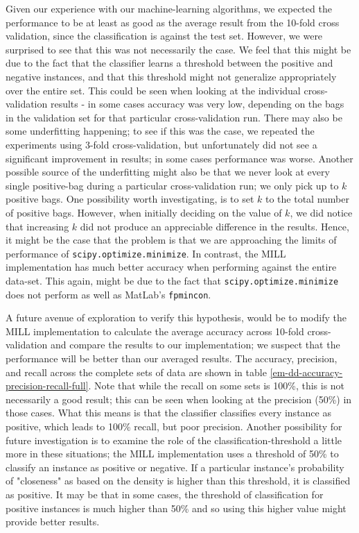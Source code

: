 \documentclass[conference]{IEEEtran}
\begin{document}
Given our experience with our machine-learning algorithms, we expected the performance to be at least as good as the average result from the 10-fold cross validation, since the classification is against the test set. However, we were surprised to see that this was not necessarily the case. We feel that this might be due to the fact that the classifier learns a threshold between the positive and negative instances, and that this threshold might not generalize appropriately over the entire set. This could be seen when looking at the individual cross-validation results - in some cases accuracy was very low, depending on the bags in the validation set for that particular cross-validation run. There may also be some underfitting happening; to see if this was the case, we repeated the experiments using 3-fold cross-validation, but unfortunately did not see a significant improvement in results; in some cases performance was worse. Another possible source of the underfitting might also be that we never look at every single positive-bag during a particular cross-validation run; we only pick up to $k$ positive bags. One possibility worth investigating, is to set $k$ to the total number of positive bags. However, when initially deciding on the value of $k$, we did notice that increasing $k$ did not produce an appreciable difference in the results. Hence, it might be the case that the problem is that we are approaching the limits of performance of \texttt{scipy.optimize.minimize}. In contrast, the MILL implementation has much better accuracy when performing against the entire data-set. This again, might be due to the fact that \texttt{scipy.optimize.minimize} does not perform as well as MatLab's \texttt{fpmincon}. 

A future avenue of exploration to verify this hypothesis, would be to modify the MILL implementation to calculate the average accuracy across 10-fold cross-validation and compare the results to our implementation; we suspect that the performance will be better than our averaged results. The accuracy, precision, and recall across the complete sets of data are shown in table \ref{em-dd-accuracy-precision-recall-full}. Note that while the recall on some sets is 100\%, this is not necessarily a good result; this can be seen when looking at the precision (50\%) in those cases. What this means is that the classifier classifies every instance as positive, which leads to 100\% recall, but poor precision. Another possibility for future investigation is to examine the role of the classification-threshold a little more in these situations; the MILL implementation uses a threshold of 50\% to classify an instance as positive or negative. If a particular instance's probability of "closeness" as based on the density is higher than this threshold, it is classified as positive. It may be that in some cases, the threshold of classification for positive instances is much higher than 50\% and so using this higher value might provide better results.
\end{document}
